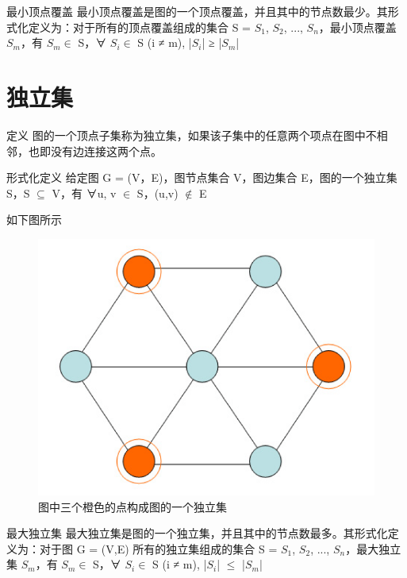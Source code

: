 \begin{definition}{最小顶点覆盖}
    最小顶点覆盖是图的一个顶点覆盖，并且其中的节点数最少。其形式化定义为：对于所有的顶点覆盖组成的集合 S = {$ S_1 $, $ S_2 $, ..., $ S_n $}，最小顶点覆盖 $ S_m $，有 $ S_m \in $ S，∀ $ S_i \in $ S (i ≠ m), |$ S_i $| ≥ |$ S_m $|
\end{definition}


\section{独立集}

\begin{definition}{定义}
    图的一个顶点子集称为独立集，如果该子集中的任意两个项点在图中不相邻，也即没有边连接这两个点。
\end{definition}

\begin{definition}{形式化定义}
    给定图 G = (V，E)，图节点集合 V，图边集合 E，图的一个独立集 S，S $\subseteq$ V，有 ∀u, v $\in$ S，(u,v) $\notin$ E
\end{definition}

\begin{example}
    如下图所示
	\begin{figure}[hbt]
        \centering
        \includegraphics[scale=0.6]{image/Proof-of-Statute2.png}
        \caption{图中三个橙色的点构成图的一个独立集}\label{fig:example}
    \end{figure}
\end{example}

\begin{definition}{最大独立集}
    最大独立集是图的一个独立集，并且其中的节点数最多。其形式化定义为：对于图 G = (V,E) 所有的独立集组成的集合 S = {$ S_1 $, $ S_2 $, ..., $ S_n $}，最大独立集 $ S_m $，有 $ S_m \in $ S，∀ $ S_i \in $ S (i ≠ m), |$ S_i $| $ \leq $ |$ S_m $|
\end{definition}


